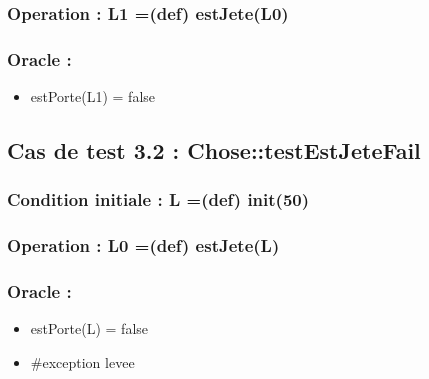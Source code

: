 \documentclass[11pt]{article}
\begin{document}
\subsubsection{Operation : L1 =(def) estJete(L0)}
\label{sec-1.5.2}

\subsubsection{Oracle :}
\label{sec-1.5.3}

\begin{itemize}

\item estPorte(L1) = false\\
\label{sec-1.5.3.1}


\end{itemize} %
\subsection{Cas de test 3.2 : Chose::testEstJeteFail}
\label{sec-1.6}

\subsubsection{Condition initiale : L =(def) init(50)}
\label{sec-1.6.1}

\subsubsection{Operation : L0 =(def) estJete(L)}
\label{sec-1.6.2}

\subsubsection{Oracle :}
\label{sec-1.6.3}

\begin{itemize}

\item estPorte(L) = false\\
\label{sec-1.6.3.1}


\item \#exception levee\\
\label{sec-1.6.3.2}


\end{itemize} %
\end{document}
